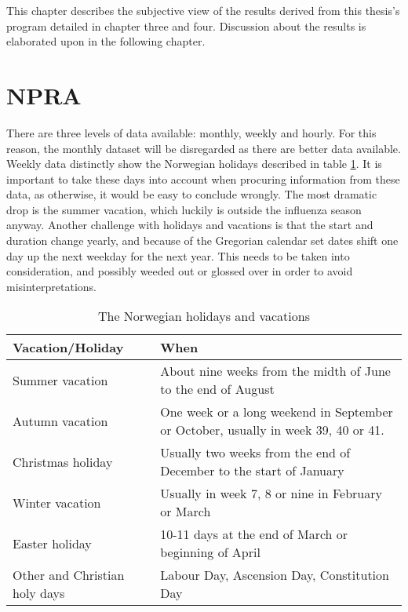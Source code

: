 This chapter describes the subjective view of the results derived from this thesis's program detailed in chapter three and four. Discussion about the results is elaborated upon in the following chapter.



\section{NPRA}
There are three levels of data available: monthly, weekly and hourly. For this reason, the monthly dataset will be disregarded as there are better data available. Weekly data distinctly show the Norwegian holidays described in table \ref{table:jesus}. It is important to take these days into account when procuring information from these data, as otherwise, it would be easy to conclude wrongly. The most dramatic drop is the summer vacation, which luckily is outside the influenza season anyway. Another challenge with holidays and vacations is that the start and duration change yearly, and because of the Gregorian calendar set dates shift one day up the next weekday for the next year. This needs to be taken into consideration, and possibly weeded out or glossed over in order to avoid misinterpretations.

\begin{center}
\begin{table}[!h]
\begin{tabular}{ | m{9em} | m{10cm}| }
 \hline
 \textbf{Vacation/Holiday} & \textbf{When} \\ [0.5ex] 
 \hline
 Summer vacation & About nine weeks from the midth of June to the end of August  \\ 
 \hline 
 Autumn vacation & One week or a long weekend in September or October, usually in week 39, 40 or 41.\\ 
 \hline
 Christmas holiday & Usually two weeks from the end of December to the start of January\\ 
 \hline
 Winter vacation & Usually in week 7, 8 or nine in February or March \\ 
  \hline
 Easter holiday & 10-11 days at the end of March or beginning of April \\ 
  \hline
 Other and Christian holy days & Labour Day, Ascension Day, Constitution Day \\ 
  \hline
\end{tabular}
\caption{The Norwegian holidays and vacations}
 \label{table:jesus}
\end{table}
\end{center}

